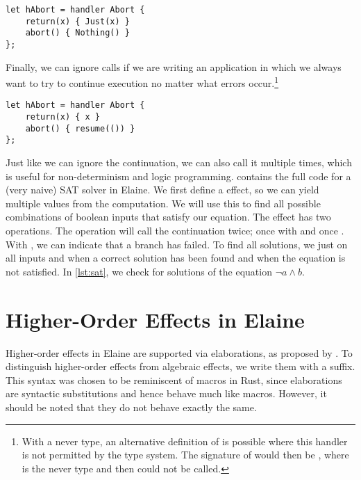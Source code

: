 \begin{lstlisting}[language=elaine, style=fancy]
let hAbort = handler Abort {
    return(x) { Just(x) }
    abort() { Nothing() }
};
\end{lstlisting}

Finally, we can ignore  calls if we are writing an application in which we always want to try to continue execution no matter what errors occur.\footnote{With a never type, an alternative definition of  is possible where this handler is not permitted by the type system. The signature of  would then be , where \el{!} is the never type and then  could not be called.}

\begin{lstlisting}[language=elaine, style=fancy]
let hAbort = handler Abort {
    return(x) { x }
    abort() { resume(()) }
};
\end{lstlisting}

Just like we can ignore the continuation, we can also call it multiple times, which is useful for non-determinism and logic programming.  contains the full code for a (very naive) SAT solver in Elaine. We first define a  effect, so we can yield multiple values from the computation. We will use this to find all possible combinations of boolean inputs that satisfy our equation. The  effect has two operations. The  operation will call the continuation twice; once with  and once . With , we can indicate that a branch has failed. To find all solutions, we just  on all inputs and  when a correct solution has been found and  when the equation is not satisfied. In \cref{lst:sat}, we check for solutions of the equation $\neg a \wedge b$.



\section{Higher-Order Effects in Elaine}

Higher-order effects in Elaine are supported via elaborations, as proposed by \textcite{bach_poulsen_hefty_2023}. To distinguish higher-order effects from algebraic effects, we write them with a \el{!} suffix. This syntax was chosen to be reminiscent of macros in Rust, since elaborations are syntactic substitutions and hence behave much like macros. However, it should be noted that they do not behave exactly the same.

